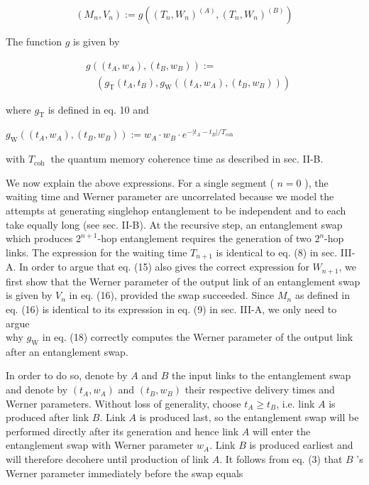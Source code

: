 \documentclass[10pt]{article}
\begin{document}
\begin{equation*}
\left(M_{n}, V_{n}\right):=g\left(\left(T_{n}, W_{n}\right)^{(A)},\left(T_{n}, W_{n}\right)^{(B)}\right) \tag{16}
\end{equation*}


The function $g$ is given by


\begin{align*}
& g\left(\left(t_{A}, w_{A}\right),\left(t_{B}, w_{B}\right)\right):=  \tag{17}\\
& \quad\left(g_{\mathrm{T}}\left(t_{A}, t_{B}\right), g_{\mathrm{W}}\left(\left(t_{A}, w_{A}\right),\left(t_{B}, w_{B}\right)\right)\right)
\end{align*}


where $g_{\mathrm{T}}$ is defined in eq. 10 and

$g_{\mathrm{W}}\left(\left(t_{A}, w_{A}\right),\left(t_{B}, w_{B}\right)\right):=w_{A} \cdot w_{B} \cdot e^{-\left|t_{A}-t_{B}\right| / T_{\text {coh }}}$

with $T_{\text {coh }}$ the quantum memory coherence time as described in sec. II-B.

We now explain the above expressions. For a single segment ( $n=0$ ), the waiting time and Werner parameter are uncorrelated because we model the attempts at generating singlehop entanglement to be independent and to each take equally long (see sec. II-B). At the recursive step, an entanglement swap which produces $2^{n+1}$-hop entanglement requires the generation of two $2^{n}$-hop links. The expression for the waiting time $T_{n+1}$ is identical to eq. (8) in sec. III-A. In order to argue that eq. (15) also gives the correct expression for $W_{n+1}$, we first show that the Werner parameter of the output link of an entanglement swap is given by $V_{n}$ in eq. (16), provided the swap succeeded. Since $M_{n}$ as defined in eq. (16) is identical to its expression in eq. (9) in sec. III-A, we only need to argue\\
why $g_{\mathrm{W}}$ in eq. (18) correctly computes the Werner parameter of the output link after an entanglement swap.

In order to do so, denote by $A$ and $B$ the input links to the entanglement swap and denote by $\left(t_{A}, w_{A}\right)$ and $\left(t_{B}, w_{B}\right)$ their respective delivery times and Werner parameters. Without loss of generality, choose $t_{A} \geq t_{B}$, i.e. link $A$ is produced after link $B$. Link $A$ is produced last, so the entanglement swap will be performed directly after its generation and hence link $A$ will enter the entanglement swap with Werner parameter $w_{A}$. Link $B$ is produced earliest and will therefore decohere until production of link $A$. It follows from eq. (3) that $B$ 's Werner parameter immediately before the swap equals
\end{document}
